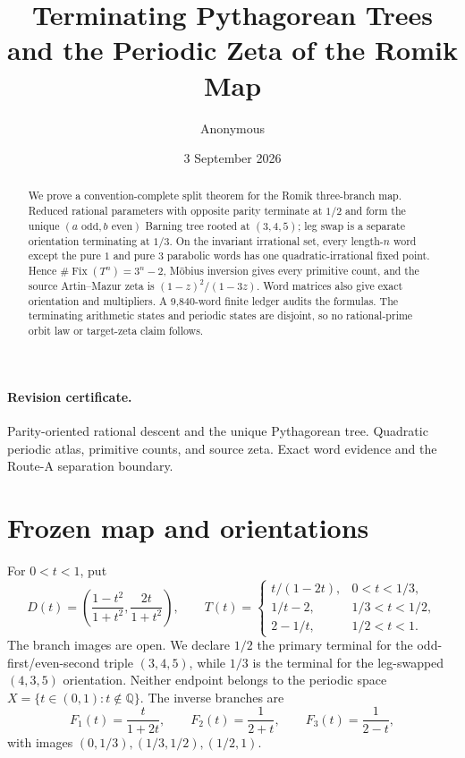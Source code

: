 \documentclass[10pt]{article}
\title{Terminating Pythagorean Trees and the Periodic Zeta of the Romik Map}
\author{Anonymous}
\date{3 September 2026}
\providecommand{\CRevisionRound}{2}
\newcommand{\Q}{\mathbb Q}
\newcommand{\Fix}{\operatorname{Fix}}
\begin{document}
\maketitle
\vspace{-1.5em}

\begin{abstract}
We prove a convention-complete split theorem for the Romik three-branch map.
Reduced rational parameters with opposite parity terminate at $1/2$ and form
the unique $(a\text{ odd},b\text{ even})$ Barning tree rooted at $(3,4,5)$;
leg swap is a separate orientation terminating at $1/3$.  On the invariant
irrational set, every length-$n$ word except the pure $1$ and pure $3$
parabolic words has one quadratic-irrational fixed point.  Hence
$\#\Fix(T^n)=3^n-2$, M\"obius inversion gives every primitive count, and the
source Artin--Mazur zeta is $(1-z)^2/(1-3z)$.  Word matrices also give exact
orientation and multipliers.  A 9,840-word finite ledger audits the formulas.
The terminating arithmetic states and periodic states are disjoint, so no
rational-prime orbit law or target-zeta claim follows.
\end{abstract}

\paragraph{Revision certificate.}
\ifcase\CRevisionRound
Parity-oriented rational descent and the unique Pythagorean tree.
\or
Quadratic periodic atlas, primitive counts, and source zeta.
\else
Exact word evidence and the Route-A separation boundary.
\fi

\section{Frozen map and orientations}
For $0<t<1$, put
\[
 D(t)=\left(\frac{1-t^2}{1+t^2},\frac{2t}{1+t^2}\right),\qquad
 T(t)=\begin{cases}
 t/(1-2t),&0<t<1/3,\\
 1/t-2,&1/3<t<1/2,\\
 2-1/t,&1/2<t<1.
 \end{cases}
\]
The branch images are open.  We declare $1/2$ the primary terminal for the
odd-first/even-second triple $(3,4,5)$, while $1/3$ is the terminal for the
leg-swapped $(4,3,5)$ orientation.  Neither endpoint belongs to the periodic
space $X=\{t\in(0,1):t\notin\Q\}$.  The inverse branches are
\[
 F_1(t)=\frac{t}{1+2t},\qquad F_2(t)=\frac1{2+t},\qquad
 F_3(t)=\frac1{2-t},
\]
with images $(0,1/3),(1/3,1/2),(1/2,1)$.
\end{document}
